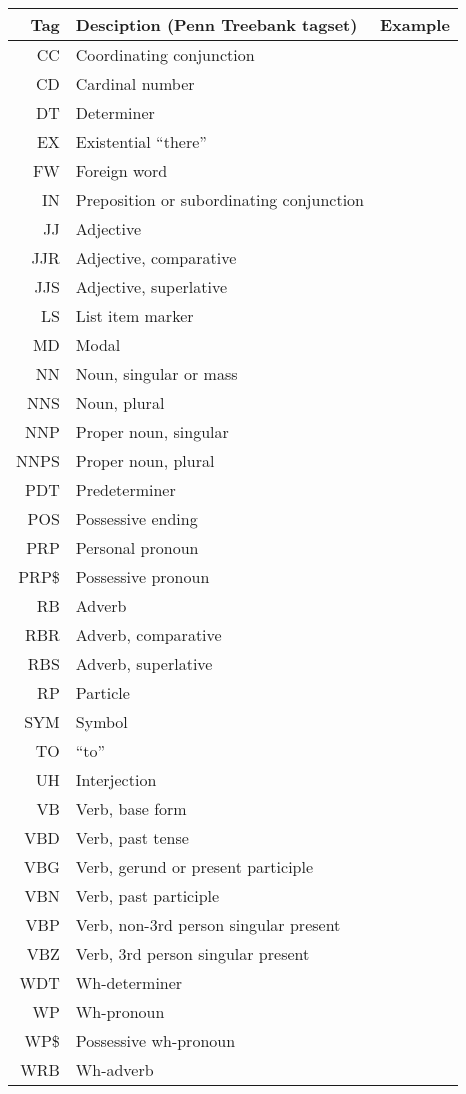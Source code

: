 \begin{tabular}{|r|l|l|}
\hline
\textbf{Tag} & \textbf{Desciption (Penn Treebank tagset)} & \textbf{Example}\\
\hline
\hline
    CC &    Coordinating conjunction  &  \hspace*{40mm} \\ \hline
    CD &    Cardinal number  & \\ \hline
    DT &    Determiner  & \\ \hline
    EX &    Existential ``there'' & \\ \hline
    FW &    Foreign word  & \\ \hline
    IN &    Preposition or subordinating conjunction  & \\ \hline
    JJ &    Adjective  & \\ \hline
    JJR &    Adjective, comparative  & \\ \hline
    JJS &    Adjective, superlative  & \\ \hline
    LS &    List item marker  & \\ \hline
    MD &    Modal  & \\ \hline
    NN &    Noun, singular or mass  & \\ \hline
    NNS &    Noun, plural  & \\ \hline
    NNP &    Proper noun, singular  & \\ \hline
    NNPS &    Proper noun, plural  & \\ \hline
    PDT &    Predeterminer  & \\ \hline
    POS &    Possessive ending  & \\ \hline
    PRP &    Personal pronoun  & \\ \hline
    PRP\$ &    Possessive pronoun  & \\ \hline
    RB &    Adverb  & \\ \hline
    RBR &    Adverb, comparative  & \\ \hline
    RBS &    Adverb, superlative  & \\ \hline
    RP &    Particle  & \\ \hline
    SYM &    Symbol  & \\ \hline
    TO &    ``to''  & \\ \hline
    UH &    Interjection  & \\ \hline
    VB &    Verb, base form  & \\ \hline
    VBD &    Verb, past tense  & \\ \hline
    VBG &    Verb, gerund or present participle  & \\ \hline
    VBN &    Verb, past participle  & \\ \hline
    VBP &    Verb, non-3rd person singular present  & \\ \hline
    VBZ &    Verb, 3rd person singular present  & \\ \hline
    WDT &    Wh-determiner  & \\ \hline
    WP &    Wh-pronoun  & \\ \hline
    WP\$ &     Possessive wh-pronoun  & \\ \hline
    WRB &     Wh-adverb  & \\
\hline
\end{tabular}